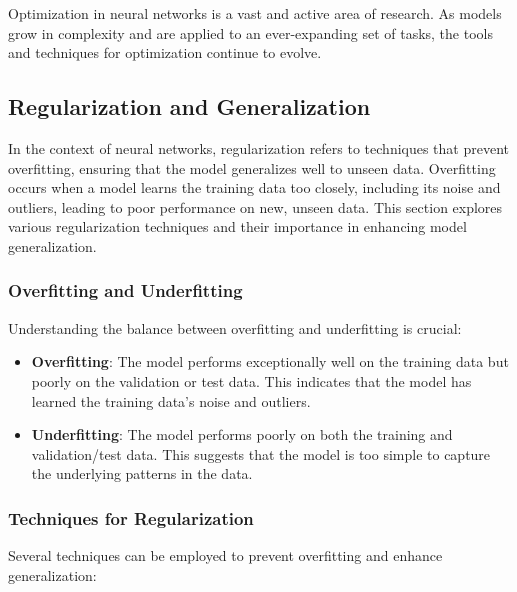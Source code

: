 Optimization in neural networks is a vast and active area of research. As models grow in complexity and are applied to an ever-expanding set of tasks, the tools and techniques for optimization continue to evolve.

\subsection{Regularization and Generalization}

In the context of neural networks, regularization refers to techniques that prevent overfitting, ensuring that the model generalizes well to unseen data. Overfitting occurs when a model learns the training data too closely, including its noise and outliers, leading to poor performance on new, unseen data. This section explores various regularization techniques and their importance in enhancing model generalization.

\subsubsection{Overfitting and Underfitting}

Understanding the balance between overfitting and underfitting is crucial:

\begin{itemize}
    \item \textbf{Overfitting}: The model performs exceptionally well on the training data but poorly on the validation or test data. This indicates that the model has learned the training data's noise and outliers.
    \item \textbf{Underfitting}: The model performs poorly on both the training and validation/test data. This suggests that the model is too simple to capture the underlying patterns in the data.
\end{itemize}

\subsubsection{Techniques for Regularization}

Several techniques can be employed to prevent overfitting and enhance generalization:

